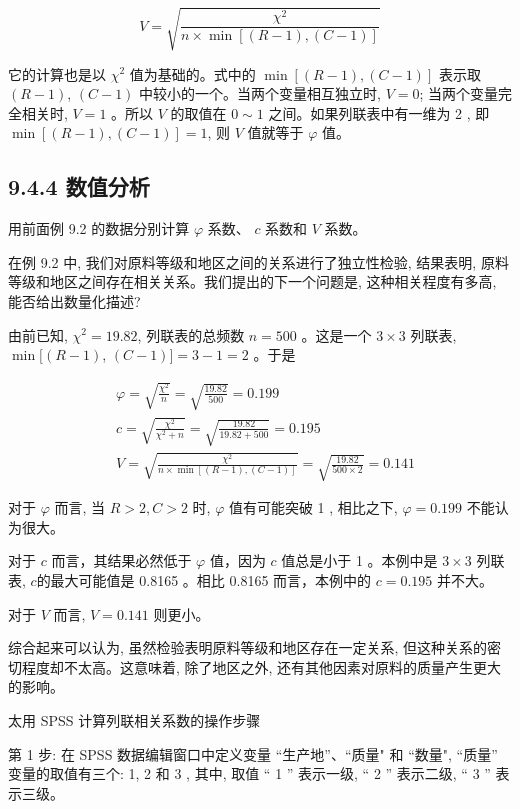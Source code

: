 \documentclass[10pt]{article}
\begin{document}
\begin{CJK*}{UTF8}{bsmi}
\begin{equation*}
V=\sqrt{\frac{\chi^{2}}{n \times \min [(R-1),(C-1)]}} \tag{9.6}
\end{equation*}


它的计算也是以 $\chi^{2}$ 值为基础的。式中的 $\min [(R-1),(C-1)]$ 表示取 $(R-1)$, $(C-1)$ 中较小的一个。当两个变量相互独立时, $V=0$; 当两个变量完全相关时, $V=1$ 。所以 $V$ 的取值在 $0 \sim 1$ 之间。如果列联表中有一维为 2 , 即 $\min [(R-1),(C-1)]=1$, 则 $V$ 值就等于 $\varphi$ 值。

\subsection*{9.4.4 数值分析}
用前面例 9.2 的数据分别计算 $\varphi$ 系数、 $c$ 系数和 $V$ 系数。

在例 9.2 中, 我们对原料等级和地区之间的关系进行了独立性检验, 结果表明, 原料等级和地区之间存在相关关系。我们提出的下一个问题是, 这种相关程度有多高, 能否给出数量化描述?

由前已知, $\chi^{2}=19.82$, 列联表的总频数 $n=500$ 。这是一个 $3 \times 3$ 列联表, $\min [(R-1)$, $(C-1)]=3-1=2$ 。于是

$$
\begin{aligned}
& \varphi=\sqrt{\frac{\chi^{2}}{n}}=\sqrt{\frac{19.82}{500}}=0.199 \\
& c=\sqrt{\frac{\chi^{2}}{\chi^{2}+n}}=\sqrt{\frac{19.82}{19.82+500}}=0.195 \\
& V=\sqrt{\frac{\chi^{2}}{n \times \min [(R-1),(C-1)]}}=\sqrt{\frac{19.82}{500 \times 2}}=0.141
\end{aligned}
$$

对于 $\varphi$ 而言, 当 $R>2, C>2$ 时, $\varphi$ 值有可能突破 1 , 相比之下, $\varphi=0.199$ 不能认为很大。

对于 $c$ 而言，其结果必然低于 $\varphi$ 值，因为 $c$ 值总是小于 1 。本例中是 $3 \times 3$ 列联表, $c$的最大可能值是 0.8165 。相比 0.8165 而言，本例中的 $c=0.195$ 并不大。

对于 $V$ 而言, $V=0.141$ 则更小。

综合起来可以认为, 虽然检验表明原料等级和地区存在一定关系, 但这种关系的密切程度却不太高。这意味着, 除了地区之外, 还有其他因素对原料的质量产生更大的影响。

太用 SPSS 计算列联相关系数的操作步骤

第 1 步: 在 SPSS 数据编辑窗口中定义变量 “生产地”、“质量" 和 “数量", “质量” 变量的取值有三个: 1, 2 和 3 , 其中, 取值 “ 1 ” 表示一级, “ 2 ” 表示二级, “ 3 ” 表示三级。


\end{CJK*}
\end{document}
